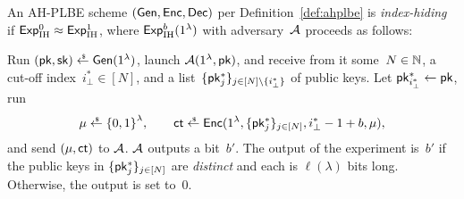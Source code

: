 \begin{definition}\label{def:ahplbe-index-hiding}
An AH-PLBE scheme $({\smash{\mathsf{Gen}}},{\smash{\mathsf{Enc}}},{\smash{\mathsf{Dec}}})$ per Definition~\ref{def:ahplbe}
is \emph{index-hiding} if ${{\smash{\mathsf{Exp}}_{\textup{IH}}^{0}}\approx{\smash{\mathsf{Exp}}_{\textup{IH}}^{1}}}$,
where ${\smash{\mathsf{Exp}}_{\textup{IH}}^{b}}(1^\lambda)$ with adversary~${\mathcal{A}}$ proceeds as follows:
\begin{security}
Run
${(\pk,\sk)\draws\Gen(1^\lambda)}$,
launch ${\mathcal{A}}(1^\lambda,{\smash{\mathsf{pk}}})$, and
receive from it
some~${N\in{\mathbb{N}}}$,
a cut-off index~${i_\bot^\ast\in[N]}$, and
a list~$\{\pk^\ast_j\}_{j\in[N]\setminus\{i_\bot^\ast\}}$ of public keys.
Let ${\pk^\ast_{i_\bot^\ast}\gets\pk}$,
run
\begin{align*}
\mu\draws\bit^\lambda,\qquad
\ct\draws\Enc(1^\lambda,\{\pk^\ast_j\}_{j\in[N]},i_\bot^\ast-1+b,\mu),
\end{align*}
and send $(\mu,{\smash{\mathsf{ct}}})$ to ${\mathcal{A}}$.
${\mathcal{A}}$ outputs a bit~$b'$.
The output of the experiment is~$b'$ if
the public keys in $\{{\smash{\mathsf{pk}}}^\ast_j\}_{j\in[N]}$ are \emph{distinct} and each is $\ell(\lambda)$ bits long.
Otherwise, the output is set to~$0$.
\end{security}
\end{definition}
